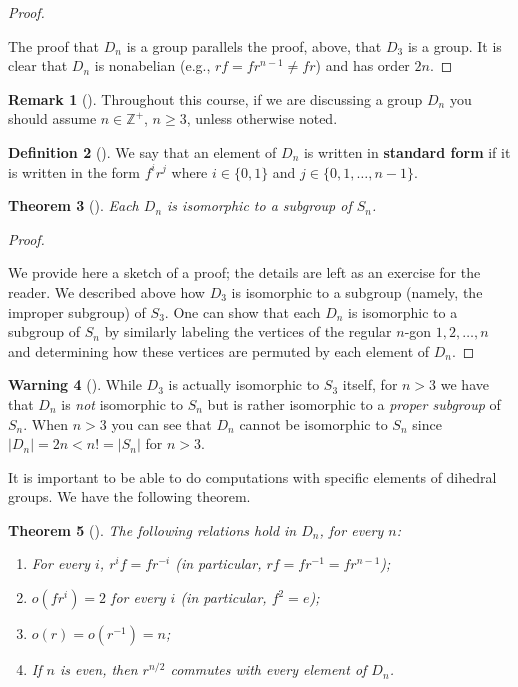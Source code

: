 \documentclass[10pt,]{book}
\newcommand{\terminology}[1]{\textbf{#1}}
\theoremstyle{plain}
\newtheorem{theorem}{Theorem}[section]
\theoremstyle{definition}
\newtheorem{definition}[theorem]{Definition}
\theoremstyle{definition}
\newtheorem{remark}[theorem]{Remark}
\newtheorem{warning}[theorem]{Warning}
\theoremstyle{definition}
\theoremstyle{definition}
\numberwithin{equation}{section}
\def\Z{\mathbb{Z}}
\newcommand{\lt}{<}
\begin{document}
\begin{proof}\hypertarget{proof-36}{}
The proof that \(D_n\) is a group parallels the proof, above, that \(D_3\) is a group. It is clear that \(D_n\) is nonabelian (e.g., \(rf=fr^{n-1}\neq fr\)) and has order \(2n\).%
\end{proof}
\begin{remark}[]\label{remark-33}
Throughout this course, if we are discussing a group \(D_n\) you should assume \(n\in \Z^+\), \(n\geq 3\), unless otherwise noted.%
\end{remark}
\begin{definition}[{}]\label{definition-55}
We say that an element of \(D_n\) is written in \terminology{standard form} if it is written in the form \(f^ir^j\) where \(i\in \{0,1\}\) and \(j\in \{0,1,\ldots,n-1\}\).%
\end{definition}
\begin{theorem}[{}]\label{theorem-44}
Each \(D_n\) is isomorphic to a subgroup of \(S_n\).%
\end{theorem}
\begin{proof}\hypertarget{proof-37}{}
We provide here a sketch of a proof; the details are left as an exercise for the reader. We described above how \(D_3\) is isomorphic to a subgroup (namely, the improper subgroup) of \(S_3\). One can show that each \(D_n\) is isomorphic to a subgroup of \(S_n\) by similarly labeling the vertices of the regular \(n\)-gon \(1,2,\ldots, n\) and determining how these vertices are permuted by each element of \(D_n\).%
\end{proof}
\begin{warning}[]\label{warning-19}
While \(D_3\) is actually isomorphic to \(S_3\) itself, for \(n>3\) we have that \(D_n\) is \emph{not} isomorphic to \(S_n\) but is rather isomorphic to a \emph{proper subgroup} of \(S_n\). When \(n>3\) you can see that \(D_n\) cannot be isomorphic to \(S_n\) since \(|D_n|=2n \lt  n! = |S_n|\) for \(n>3\).%
\end{warning}
It is important to be able to do computations with specific elements of dihedral groups. We have the following theorem.%
\begin{theorem}[{}]\label{diords}
The following relations hold in \(D_n\), for every \(n\): \leavevmode%
\begin{enumerate}
\item\hypertarget{li-350}{}For every \(i\), \(r^if=fr^{-i}\) (in particular, \(rf=fr^{-1}=fr^{n-1}\));%
\item\hypertarget{li-351}{}\(o(fr^i)=2\) for every \(i\) (in particular, \(f^2=e\));%
\item\hypertarget{li-352}{}\(o(r)=o(r^{-1})=n\);%
\item\hypertarget{li-353}{}If \(n\) is even, then \(r^{n/2}\) commutes with every element of \(D_n\).%
\end{enumerate}
%
\end{theorem}
\end{document}
